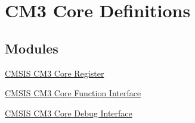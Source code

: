\hypertarget{group___c_m_s_i_s___c_m3__core__definitions}{}\section{C\+M3 Core Definitions}
\label{group___c_m_s_i_s___c_m3__core__definitions}
\subsection*{Modules}
\begin{DoxyCompactItemize}
\item 
\hyperlink{group___c_m_s_i_s___c_m3__core__register}{C\+M\+S\+I\+S C\+M3 Core Register}
\item 
\hyperlink{group___c_m_s_i_s___c_m3___core___function_interface}{C\+M\+S\+I\+S C\+M3 Core Function Interface}
\item 
\hyperlink{group___c_m_s_i_s___c_m3___core_debug_interface}{C\+M\+S\+I\+S C\+M3 Core Debug Interface}
\end{DoxyCompactItemize}
